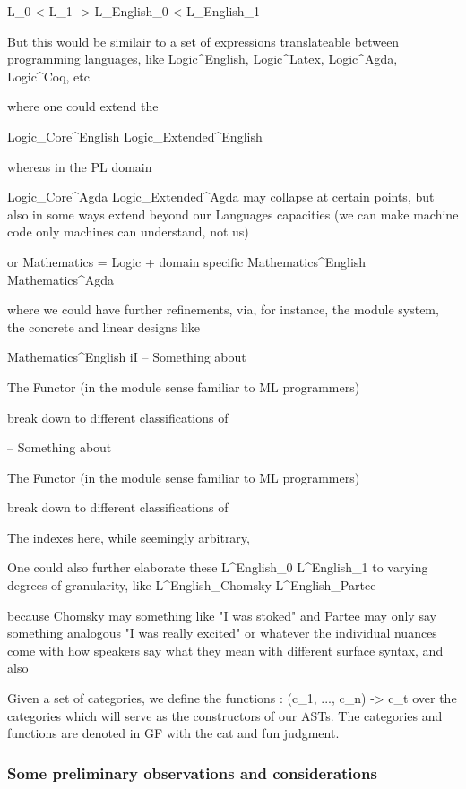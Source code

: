 \documentclass[11pt, a4paper]{article}
\begin{document}
  L_0 < L_1 -> L_English_0 < L_English_1

But this would be similair to a set of expressions translateable between
programming languages, like Logic^English, Logic^Latex, Logic^Agda, Logic^Coq,
etc

where one could extend the

Logic_Core^English Logic_Extended^English

whereas in the PL domain

Logic_Core^Agda Logic_Extended^Agda may collapse at certain points, but also in
some ways extend beyond our Languages capacities (we can make machine code only
machines can understand, not us)

or Mathematics = Logic + domain specific Mathematics^English Mathematics^Agda

where we could have further refinements, via, for instance, the module system,
the concrete and linear designs like

Mathematics^English iI -- Something about

  The Functor (in the module sense familiar to ML programmers)

  break down to different classifications of

-- Something about

  The Functor (in the module sense familiar to ML programmers)

  break down to different classifications of

  The indexes here, while seemingly arbitrary,

  One could also further elaborate these L^English_0 L^English_1 to varying
degrees of granularity, like L^English_Chomsky L^English_Partee

  because Chomsky may something like "I was stoked" and Partee may only say
something analogous "I was really excited" or whatever the individual nuances
come with how speakers say what they mean with different surface syntax, and
also

Given a set of categories, we define the functions \phi : (c_1, ..., c_n) -> c_t
over the categories which will serve as the constructors of our ASTs. The
categories and functions are denoted in GF with the cat and fun judgment.

\subsubsection {Some preliminary observations and considerations}
\end{document}
